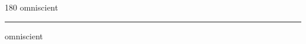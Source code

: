 
\begin{frame}
\begin{center}
\begin{turn}{180}
{\fontsize{2.5cm}{1em}\selectfont omniscient}
\end{turn}
\vspace{1em}\par  
\hrule
\vspace{1em}\par  
{\fontsize{2.5cm}{1em}\selectfont omniscient}
\end{center}
\end{frame}
